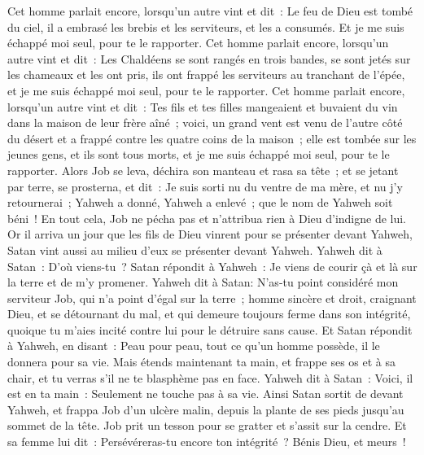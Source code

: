 \begin{multicols}{2}
Cet homme parlait encore, lorsqu'un autre vint et dit~: Le feu de Dieu est tombé du ciel, il a embrasé les brebis et les serviteurs, et les a consumés. Et je me suis échappé moi seul, pour te le rapporter.
Cet homme parlait encore, lorsqu'un autre vint et dit~: Les Chaldéens se sont rangés en trois bandes, se sont jetés sur les chameaux et les ont pris, ils ont frappé les serviteurs au tranchant de l'épée, et je me suis échappé moi seul, pour te le rapporter.
Cet homme parlait encore, lorsqu'un autre vint et dit~: Tes fils et tes filles mangeaient et buvaient du vin dans la maison de leur frère aîné~;
voici, un grand vent est venu de l'autre côté du désert et a frappé contre les quatre coins de la maison~; elle est tombée sur les jeunes gens, et ils sont tous morts, et je me suis échappé moi seul, pour te le rapporter.
Alors Job se leva, déchira son manteau et rasa sa tête~; et se jetant par terre, se prosterna,
et dit~: Je suis sorti nu du ventre de ma mère, et nu j'y retournerai~; Yahweh a donné, Yahweh a enlevé~; que le nom de Yahweh soit béni~!
En tout cela, Job ne pécha pas et n'attribua rien à Dieu d'indigne de lui.
\VerseOne{}Or il arriva un jour que les fils de Dieu vinrent pour se présenter devant Yahweh, Satan vint aussi au milieu d'eux se présenter devant Yahweh.
Yahweh dit à Satan~: D'où viens-tu~? Satan répondit à Yahweh~: Je viens de courir çà et là sur la terre et de m'y promener.
Yahweh dit à Satan: N'as-tu point considéré mon serviteur Job, qui n'a point d'égal sur la terre~; homme sincère et droit, craignant Dieu, et se détournant du mal, et qui demeure toujours ferme dans son intégrité, quoique tu m'aies incité contre lui pour le détruire sans cause.
Et Satan répondit à Yahweh, en disant~: Peau pour peau, tout ce qu'un homme possède, il le donnera pour sa vie.
Mais étends maintenant ta main, et frappe ses os et à sa chair, et tu verras s'il ne te blasphème pas en face. 
Yahweh dit à Satan~: Voici, il est en ta main~: Seulement ne touche pas à sa vie.
Ainsi Satan sortit de devant Yahweh, et frappa Job d'un ulcère malin, depuis la plante de ses pieds jusqu'au sommet de la tête.
Job prit un tesson pour se gratter et s'assit sur la cendre.
Et sa femme lui dit~: Persévéreras-tu encore ton intégrité~? Bénis Dieu, et meurs~!

\end{multicols}
